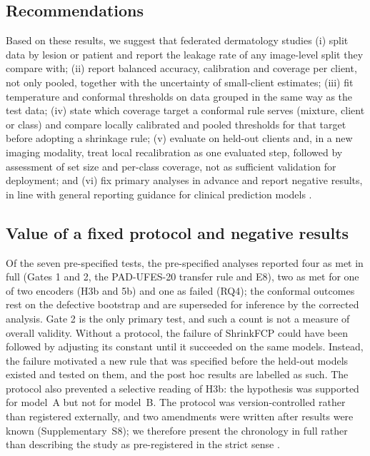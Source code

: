 \documentclass[VANCOUVER,Times1COL]{WileyNJDv5}
\begin{document}
\subsection{Recommendations}

Based on these results, we suggest that federated dermatology studies (i) split data by lesion or patient
and report the leakage rate of any image-level split they compare with; (ii) report balanced accuracy,
calibration and coverage per client, not only pooled, together with the uncertainty of small-client
estimates; (iii) fit temperature and conformal thresholds on data grouped in the same way as the test data;
(iv) state which coverage target a conformal rule serves (mixture, client or class) and compare locally
calibrated and pooled thresholds for that target before adopting a shrinkage rule; (v) evaluate on held-out
clients and, in a new imaging modality, treat local recalibration as one evaluated step, followed by assessment of set size and per-class coverage, not as sufficient validation for deployment; and (vi) fix primary analyses in advance and report negative results, in line with
general reporting guidance for clinical prediction models \cite{collins2024tripodai}.

\subsection{Value of a fixed protocol and negative results}

Of the seven pre-specified tests, the pre-specified analyses reported four as met in full (Gates 1 and 2, the PAD-UFES-20 transfer rule and E8), two as met for one of two encoders (H3b and 5b) and one as failed (RQ4); the conformal outcomes rest on the defective bootstrap and are superseded for inference by the corrected analysis. Gate 2 is the only primary test, and such a count is not a measure of overall validity. Without a protocol, the failure of ShrinkFCP could have been
followed by adjusting its constant until it succeeded on the same models. Instead, the failure motivated a
new rule that was specified before the held-out models existed and tested on them, and the post hoc results
are labelled as such. The protocol also prevented a selective reading of H3b: the hypothesis was supported
for model~A but not for model~B. The protocol was version-controlled rather than registered externally, and
two amendments were written after results were known (Supplementary~S8); we therefore present the chronology in
full rather than describing the study as pre-registered in the strict sense
\cite{nosek2018preregistration,kapoor2023leakage,varoquaux2022failures}.
\end{document}
